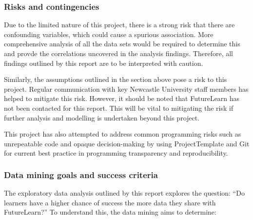 \documentclass[
]{article}
\begin{document}
\hypertarget{risks-and-contingencies}{%
\subsubsection{Risks and contingencies}\label{risks-and-contingencies}}

Due to the limited nature of this project, there is a strong risk that
there are confounding variables, which could cause a spurious
association. More comprehensive analysis of all the data sets would be
required to determine this and provde the correlations uncovered in the
analysis findings. Therefore, all findings outlined by this report are
to be interpreted with caution.

Similarly, the assumptions outlined in the section above pose a risk to
this project. Regular communication with key Newcastle University staff
members has helped to mitigate this risk. However, it should be noted
that FutureLearn has not been contacted for this report. This will be
vital to mitigating the risk if further analysis and modelling is
undertaken beyond this project.

This project has also attempted to address common programming risks such
as unrepeatable code and opaque decision-making by using ProjectTemplate
and Git for current best practice in programming transparency and
reproducibility.

\hypertarget{data-mining-goals-and-success-criteria}{%
\subsubsection{Data mining goals and success
criteria}\label{data-mining-goals-and-success-criteria}}

The exploratory data analysis outlined by this report explores the
question: ``Do learners have a higher chance of success the more data
they share with FutureLearn?'' To understand this, the data mining aims
to determine:
\end{document}
